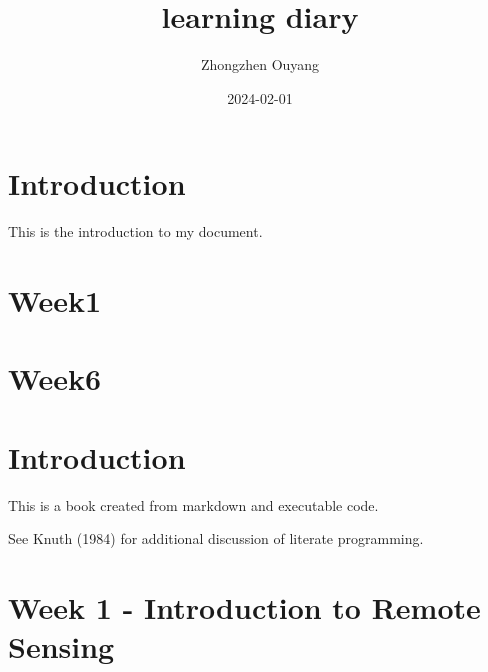 \documentclass[
  letterpaper,
  DIV=11,
  numbers=noendperiod]{scrreprt}
\title{learning diary}
\author{Zhongzhen Ouyang}
\date{2024-02-01}
\renewcommand*\contentsname{Table of contents}
\newcommand\contentsname{Table of contents}
\begin{document}
\maketitle
\ifdefined\Shaded\renewenvironment{Shaded}{\begin{tcolorbox}[interior hidden, boxrule=0pt, borderline west={3pt}{0pt}{shadecolor}, sharp corners, enhanced, frame hidden, breakable]}{\end{tcolorbox}}\fi

\renewcommand*\contentsname{Table of contents}
{
\hypersetup{linkcolor=}
\setcounter{tocdepth}{2}
\tableofcontents
}

\hypertarget{introduction}{%
\chapter{Introduction}\label{introduction}}

This is the introduction to my document.


\hypertarget{week1}{%
\chapter{Week1}\label{week1}}


\hypertarget{week6}{%
\chapter{Week6}\label{week6}}


\hypertarget{introduction-1}{%
\chapter{Introduction}\label{introduction-1}}

This is a book created from markdown and executable code.

See Knuth (1984) for additional discussion of literate programming.


\hypertarget{week-1---introduction-to-remote-sensing}{%
\chapter{Week 1 - Introduction to Remote
Sensing}\label{week-1---introduction-to-remote-sensing}}
\end{document}
